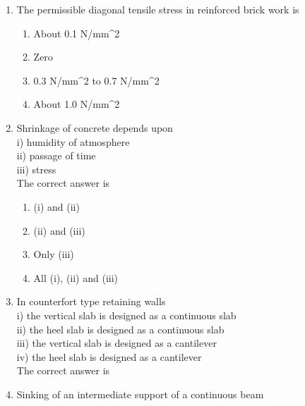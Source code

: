 \documentclass[11pt,a4paper]{article}
\begin{document}
\begin{enumerate}
\\
\item{The permissible diagonal tensile stress in reinforced brick work is}
\begin{enumerate}[label=\Alph*.]
\item{About 0.1 N/mm\^{}2}
\item{Zero}
\item{0.3 N/mm\^{}2 to 0.7 N/mm\^{}2}
\item{About 1.0 N/mm\^{}2}
\end{enumerate}
\item{Shrinkage of concrete depends upon \\
i) humidity of atmosphere \\
ii) passage of time \\
iii) stress  \\
The correct answer is}
\begin{enumerate}[label=\Alph*.]
\item{(i) and (ii)}
\item{(ii) and (iii)}
\item{Only (iii)}
\item{All (i), (ii) and (iii)}
\end{enumerate}
\item{In counterfort type retaining walls \\
i) the vertical slab is designed as a continuous slab \\
ii) the heel slab is designed as a continuous slab \\
iii) the vertical slab is designed as a cantilever \\
iv) the heel slab is designed as a cantilever \\
The correct answer is}
\\
\item{Sinking of an intermediate support of a continuous beam \\
}
\end{enumerate}
\end{document}

